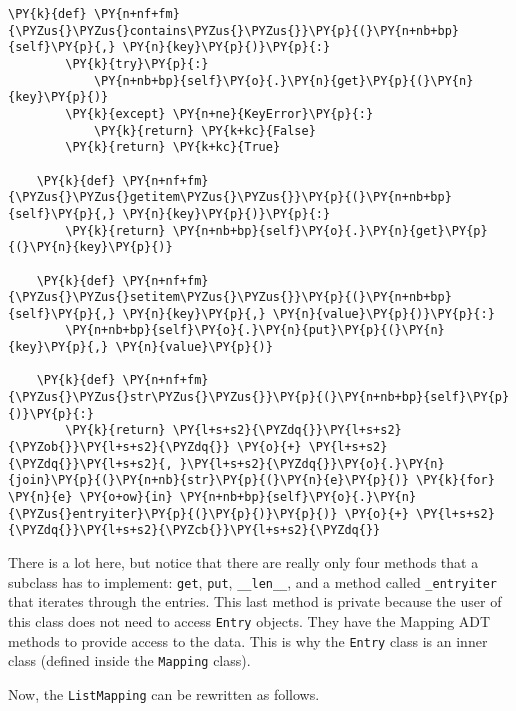 \begin{Verbatim}[commandchars=\\\{\}]
    \PY{k}{def} \PY{n+nf+fm}{\PYZus{}\PYZus{}contains\PYZus{}\PYZus{}}\PY{p}{(}\PY{n+nb+bp}{self}\PY{p}{,} \PY{n}{key}\PY{p}{)}\PY{p}{:}
        \PY{k}{try}\PY{p}{:}
            \PY{n+nb+bp}{self}\PY{o}{.}\PY{n}{get}\PY{p}{(}\PY{n}{key}\PY{p}{)}
        \PY{k}{except} \PY{n+ne}{KeyError}\PY{p}{:}
            \PY{k}{return} \PY{k+kc}{False}
        \PY{k}{return} \PY{k+kc}{True}

    \PY{k}{def} \PY{n+nf+fm}{\PYZus{}\PYZus{}getitem\PYZus{}\PYZus{}}\PY{p}{(}\PY{n+nb+bp}{self}\PY{p}{,} \PY{n}{key}\PY{p}{)}\PY{p}{:}
        \PY{k}{return} \PY{n+nb+bp}{self}\PY{o}{.}\PY{n}{get}\PY{p}{(}\PY{n}{key}\PY{p}{)}

    \PY{k}{def} \PY{n+nf+fm}{\PYZus{}\PYZus{}setitem\PYZus{}\PYZus{}}\PY{p}{(}\PY{n+nb+bp}{self}\PY{p}{,} \PY{n}{key}\PY{p}{,} \PY{n}{value}\PY{p}{)}\PY{p}{:}
        \PY{n+nb+bp}{self}\PY{o}{.}\PY{n}{put}\PY{p}{(}\PY{n}{key}\PY{p}{,} \PY{n}{value}\PY{p}{)}

    \PY{k}{def} \PY{n+nf+fm}{\PYZus{}\PYZus{}str\PYZus{}\PYZus{}}\PY{p}{(}\PY{n+nb+bp}{self}\PY{p}{)}\PY{p}{:}
        \PY{k}{return} \PY{l+s+s2}{\PYZdq{}}\PY{l+s+s2}{\PYZob{}}\PY{l+s+s2}{\PYZdq{}} \PY{o}{+} \PY{l+s+s2}{\PYZdq{}}\PY{l+s+s2}{, }\PY{l+s+s2}{\PYZdq{}}\PY{o}{.}\PY{n}{join}\PY{p}{(}\PY{n+nb}{str}\PY{p}{(}\PY{n}{e}\PY{p}{)} \PY{k}{for} \PY{n}{e} \PY{o+ow}{in} \PY{n+nb+bp}{self}\PY{o}{.}\PY{n}{\PYZus{}entryiter}\PY{p}{(}\PY{p}{)}\PY{p}{)} \PY{o}{+} \PY{l+s+s2}{\PYZdq{}}\PY{l+s+s2}{\PYZcb{}}\PY{l+s+s2}{\PYZdq{}}
\end{Verbatim}



There is a lot here, but notice that there are really only four methods that a subclass has to implement: \texttt{get}, \texttt{put}, \texttt{\_\_len\_\_}, and a method called \texttt{\_entryiter} that iterates through the entries.  This last method is private because the user of this class does not need to access \texttt{Entry} objects.  They have the Mapping ADT methods to provide access to the data.  This is why the \texttt{Entry} class is an inner class (defined inside the \texttt{Mapping} class).


Now, the \texttt{ListMapping} can be rewritten as follows.

